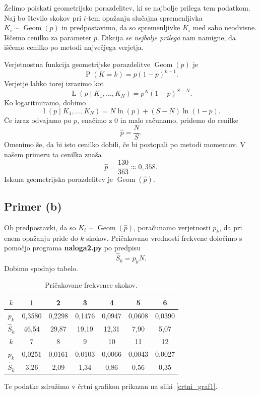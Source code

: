 \documentclass[a4paper,11pt]{article}
\DeclareMathOperator{\PP}{P}
\DeclareMathOperator{\Geom}{Geom}
\DeclareMathOperator{\Lver}{L}
\DeclareMathOperator{\lver}{l}
\begin{document}
Želimo poiskati geometrijsko porazdelitev, ki se najbolje prilega tem podatkom. 
Naj bo število skokov pri $i$-tem opažanju slučajna spremenljivka $K_i \sim \Geom(p)$
in predpostavimo, da so spremenljivke $K_i$ med sabo neodvisne. Iščemo cenilko za parameter $p$. 
Dikcija \emph{se nejbolje prilega} nam namigne, da iščemo cenilko po metodi največjega verjetja.

Verjetnostna funkcija geometrijske porazdelitve $\Geom(p)$ je 
\[\PP(K=k) = p(1-p)^{k-1}.\]
Verjetje lahko torej izrazimo kot 
\[\Lver(p \mid K_1, \ldots, K_N) = p^N (1-p)^{S - N}.\]
Ko logaritmiramo, dobimo 
\[\lver(p \mid K_1, \ldots, K_N) = N \ln(p) + (S-N) \ln(1-p).\]
Če izraz odvajamo po $p$, enačimo z $0$ in malo računamo, pridemo do cenilke
\[\hat{p} = \frac{N}{S}.\]
Omenimo še, da bi isto cenilko dobili, če bi postopali po metodi momentov.
V našem primeru ta cenilka znaša 
\[\hat{p} = \frac{130}{363} \approx 0,358.\]
Iskana geometrijska porazdelitev je $\Geom(\hat{p})$.

\subsection*{Primer (b)}

Ob predpostavki, da so $K_i \sim \Geom(\hat{p})$, poračunamo verjetnosti $p_k$, da pri enem opažanju pride do $k$ skokov.
Pričakovano vrednosti frekvenc določimo s pomočjo programa \textbf{naloga2.py} po predpisu
\[\hat{S}_k = p_k N.\]
Dobimo spodnjo tabelo.
\begin{table}[H]
    \centering
    \begin{tabular}{|c|c|c|c|c|c|c|}
    \hline
    $k$ & 1 & 2 & 3 & 4 & 5 & 6 \\ \hline
    $p_k$ & 0,3580 & 0,2298 & 0,1476 & 0,0947 & 0,0608 & 0,0390  \\ \hline
    $\hat{S}_k$ & 46,54 & 29,87 & 19,19 & 12,31 & 7,90 & 5,07 \\ \hline
    $k$ & 7 & 8 & 9 & 10 & 11 & 12 \\ \hline
    $p_k$ & 0,0251 & 0,0161 & 0,0103 & 0,0066 & 0,0043 & 0,0027 \\ \hline
    $\hat{S}_k$ & 3,26 & 2,09 & 1,34 & 0,86 & 0,56 & 0,35 \\ \hline
\end{tabular}
\caption{Pričakovane frekvence skokov.}
\label{PricakovaneFreq}
\end{table}

\noindent Te podatke združimo v črtni grafikon prikazan na sliki~\ref{crtni_graf1}.
\end{document}
